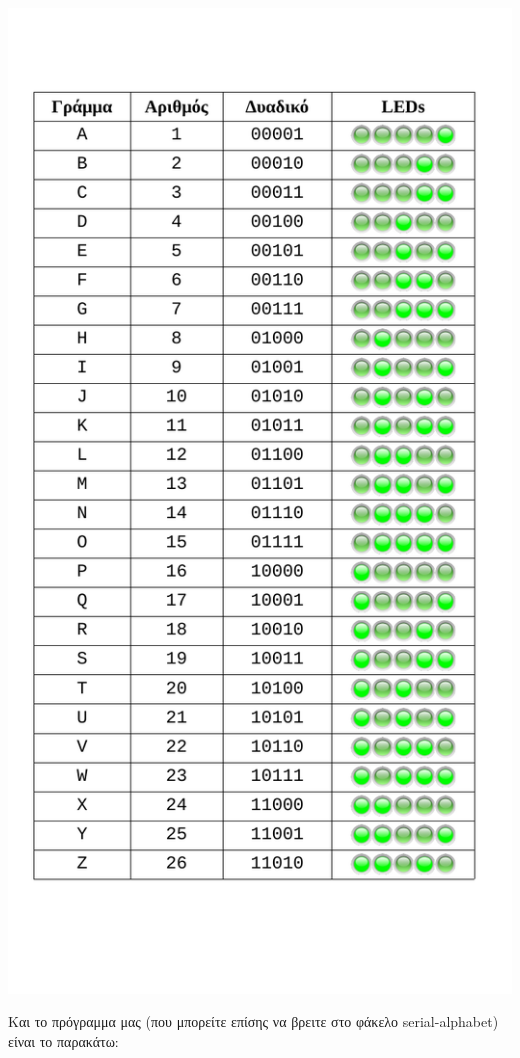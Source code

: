 \documentclass[a4paper,twoside,12pt]{article}
\begin{document}
\begin{center}
  \includegraphics[width=1.0\textwidth]{images/main/led-table}
\end{center}

Και το πρόγραμμα μας (που μπορείτε επίσης να βρειτε στο φάκελο serial-alphabet) είναι το παρακάτω:
\end{document}

